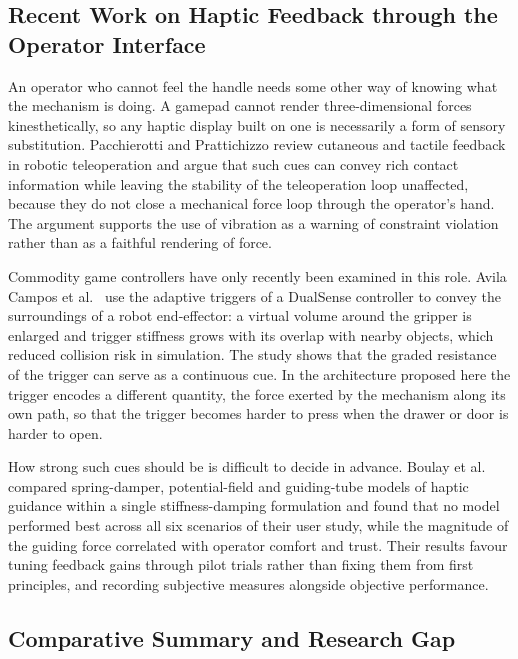\documentclass[11pt,letterpaper]{article}
\begin{document}
\subsection{Recent Work on Haptic Feedback through the Operator Interface}
\label{sec:recent-haptics}

An operator who cannot feel the handle needs some other way of knowing what the mechanism is doing. A gamepad cannot render three-dimensional forces kinesthetically, so any haptic display built on one is necessarily a form of sensory substitution. Pacchierotti and Prattichizzo \cite{pacchierotti2024cutaneous} review cutaneous and tactile feedback in robotic teleoperation and argue that such cues can convey rich contact information while leaving the stability of the teleoperation loop unaffected, because they do not close a mechanical force loop through the operator's hand. The argument supports the use of vibration as a warning of constraint violation rather than as a faithful rendering of force.

Commodity game controllers have only recently been examined in this role. Avila Campos et al.\ \cite{avilacampos2024conveying} use the adaptive triggers of a DualSense controller to convey the surroundings of a robot end-effector: a virtual volume around the gripper is enlarged and trigger stiffness grows with its overlap with nearby objects, which reduced collision risk in simulation. The study shows that the graded resistance of the trigger can serve as a continuous cue. In the architecture proposed here the trigger encodes a different quantity, the force exerted by the mechanism along its own path, so that the trigger becomes harder to press when the drawer or door is harder to open.

How strong such cues should be is difficult to decide in advance. Boulay et al.\ \cite{boulay2026selecting} compared spring-damper, potential-field and guiding-tube models of haptic guidance within a single stiffness-damping formulation and found that no model performed best across all six scenarios of their user study, while the magnitude of the guiding force correlated with operator comfort and trust. Their results favour tuning feedback gains through pilot trials rather than fixing them from first principles, and recording subjective measures alongside objective performance.

\subsection{Comparative Summary and Research Gap}
\label{sec:gap}
\end{document}
